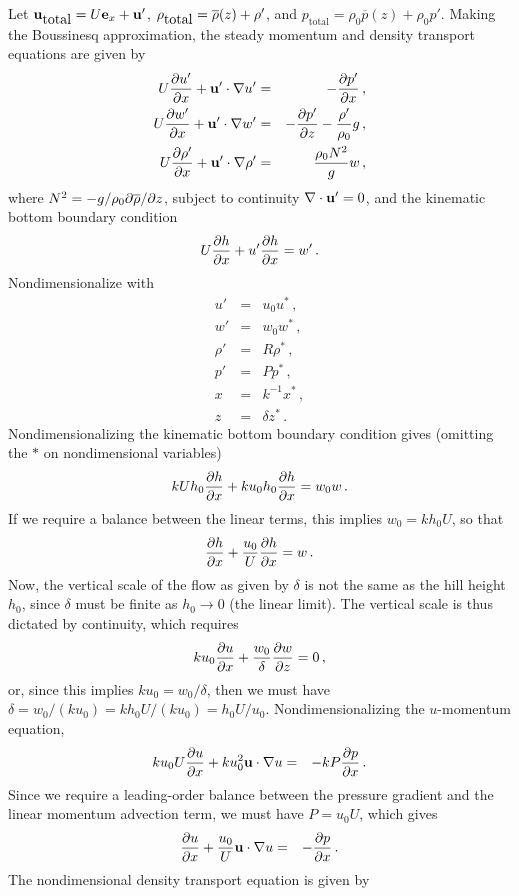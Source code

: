 \documentclass[12pt]{article}
\begin{document}
	Let $\mathbf{u}_{\mbox{total}} = U {\bf e}_x + \mathbf{u}'$, $\rho_{\mbox{total}} = \overline{\rho}(z) + \rho'$, and
	$p_{\mbox{total}} = \rho_0 \overline{p}(z) + \rho_0 p'$.
	Making the Boussinesq approximation, the steady momentum and density transport equations are given by
	\begin{eqnarray*}
	U \frac{\partial{u'}}{\partial{x}} + \mathbf{u}'\cdot\nabla u' &=& -\frac{\partial{p'}}{\partial{x}}\,,\\
	U \frac{\partial{w'}}{\partial{x}} + \mathbf{u}'\cdot\nabla w' &=& -\frac{\partial{p'}}{\partial{z}} - \frac{\rho'}{\rho_0} g\,,\\
	U \frac{\partial{\rho'}}{\partial{x}} + \mathbf{u}'\cdot\nabla\rho' &=& \frac{\rho_0 N^2}{g} w\,,
	\end{eqnarray*}
	where $N^2 = -g/\rho_0 \partial\overline{\rho}/\partial z$, subject to continuity $\nabla\cdot\mathbf{u}'=0$, and
	the kinematic bottom boundary condition
	\[
	U\frac{\partial{h}}{\partial{x}} + u' \frac{\partial{h}}{\partial{x}} = w'\,.
	\]  
	Nondimensionalize with
	\begin{eqnarray*}
		u' &=& u_0 u^*\,,\\
		w' &=& w_0 w^*\,,\\
		\rho' &=& R \rho^*\,,\\
		p' &=& P p^*\,,\\
		x &=& k^{-1} x^*\,,\\
		z &=& \delta z^*\,.
	\end{eqnarray*}
	Nondimensionalizing the kinematic bottom boundary condition gives
	(omitting the $*$ on nondimensional variables)
	\[
	k U h_0 \frac{\partial{h}}{\partial{x}} + k u_0 h_0 \frac{\partial{h}}{\partial{x}} = w_0 w\,.
	\]
	If we require a balance between the linear terms, this implies $w_0 = k h_0 U$, so that
	\[
	\frac{\partial{h}}{\partial{x}} + \frac{u_0}{U} \frac{\partial{h}}{\partial{x}} = w\,.
	\]
	Now, the vertical scale of the flow as given by $\delta$ is not the
	same as the hill height $h_0$, since $\delta$ must be finite as $h_0\to 0$ (the linear limit). The 
	vertical scale is thus dictated by continuity, which requires
	\[
	k u_0 \frac{\partial{u}}{\partial{x}} + \frac{w_0}{\delta} \frac{\partial{w}}{\partial{z}} = 0\,,
	\]
	or, since this implies $k u_0 = w_0/\delta$, then we must have $\delta = w_0/(k u_0) = k h_0 U/(k u_0) = h_0U/u_0$.
	Nondimensionalizing the $u$-momentum equation,
	\begin{eqnarray*}
	k u_0 U \frac{\partial{u}}{\partial{x}} + k u_0^2\mathbf{u}\cdot\nabla u  &=& -k P \frac{\partial{p}}{\partial{x}}\,.
	\end{eqnarray*}
	Since we require a leading-order balance between the pressure gradient and the linear momentum advection term,
	we must have $P = u_0 U$, which gives
	\begin{eqnarray*}
	\frac{\partial{u}}{\partial{x}} + \frac{u_0}{U} \mathbf{u}\cdot\nabla u &=& -\frac{\partial{p}}{\partial{x}}\,.
	\end{eqnarray*}
	The nondimensional density transport equation is given by
\end{document}
